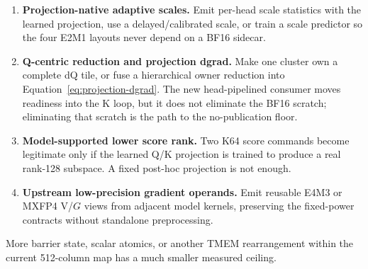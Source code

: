 \begin{enumerate}
  \item \textbf{Projection-native adaptive scales.}  Emit per-head scale
  statistics with the learned projection, use a delayed/calibrated scale, or
  train a scale predictor so the four E2M1 layouts never depend on a BF16
  sidecar.
  \item \textbf{Q-centric reduction and projection dgrad.}  Make one cluster
  own a complete dQ tile, or fuse a hierarchical owner reduction into
  Equation~\ref{eq:projection-dgrad}.  The new head-pipelined consumer moves
  readiness into the K loop, but it does not eliminate the BF16 scratch;
  eliminating that scratch is the path to the no-publication floor.
  \item \textbf{Model-supported lower score rank.}  Two K64 score commands
  become legitimate only if the learned Q/K projection is trained to produce
  a real rank-128 subspace.  A fixed post-hoc projection is not enough.
  \item \textbf{Upstream low-precision gradient operands.}  Emit reusable
  E4M3 or MXFP4 V/$G$ views from adjacent model kernels, preserving the
  fixed-power contracts without standalone preprocessing.
\end{enumerate}

More barrier state, scalar atomics, or another TMEM rearrangement within the
current 512-column map has a much smaller measured ceiling.
